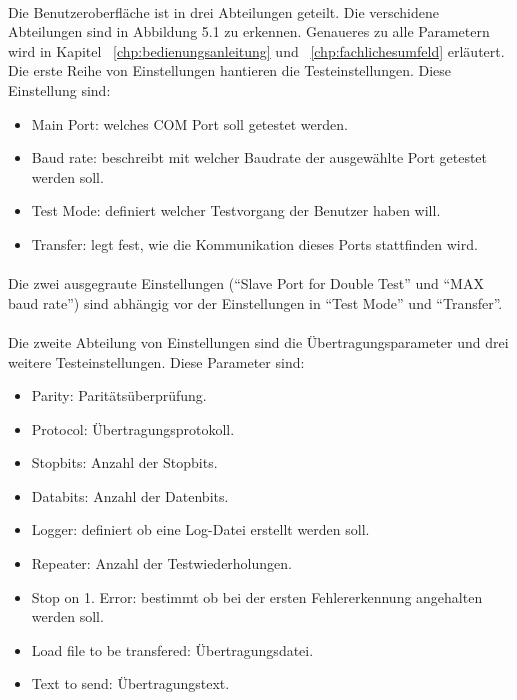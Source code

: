 \paragraph{}
Die Benutzeroberfläche ist in drei Abteilungen geteilt. Die verschidene Abteilungen sind in Abbildung 5.1 zu erkennen. Genaueres zu alle Parametern wird in Kapitel ~\ref{chp:bedienungsanleitung} und  ~\ref{chp:fachlichesumfeld} erläutert. Die erste Reihe von Einstellungen hantieren die Testeinstellungen. Diese Einstellung sind:
\begin{itemize}
\item Main Port: welches COM Port soll getestet werden.
\item Baud rate: beschreibt mit welcher Baudrate der ausgewählte Port getestet werden soll.
\item Test Mode: definiert welcher Testvorgang der Benutzer haben will.
\item Transfer: legt fest, wie die Kommunikation dieses Ports stattfinden wird.
\end{itemize}

\paragraph{}
Die zwei ausgegraute Einstellungen ("`Slave Port for Double Test"' und "`MAX baud rate"') sind abhängig vor der Einstellungen in "`Test Mode"' und "`Transfer"'. 

\paragraph{}
Die zweite Abteilung von Einstellungen sind die Übertragungsparameter und drei weitere Testeinstellungen. Diese Parameter sind:
\begin{itemize}
\item Parity: Paritätsüberprüfung.
\item Protocol: Übertragungsprotokoll.
\item Stopbits: Anzahl der Stopbits.
\item Databits: Anzahl der Datenbits.
\item Logger: definiert ob eine Log-Datei erstellt werden soll.
\item Repeater: Anzahl der Testwiederholungen.
\item Stop on 1. Error: bestimmt ob bei der ersten Fehlererkennung angehalten werden soll.
\item Load file to be transfered: Übertragungsdatei.
\item Text to send: Übertragungstext.
\end{itemize}

